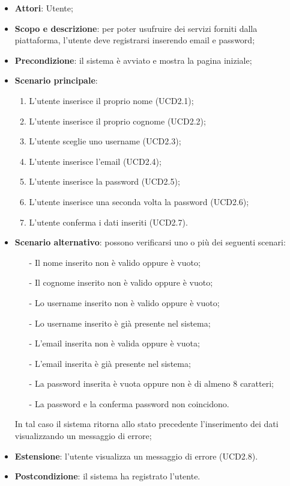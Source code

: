 \begin{itemize}
\item \textbf{Attori}: Utente;
\item \textbf{Scopo e descrizione}: per poter usufruire dei servizi forniti dalla piattaforma, l'utente deve registrarsi inserendo email e password;
\item \textbf{Precondizione}: il sistema è avviato e mostra la pagina iniziale;
\item \textbf{Scenario principale}:
	\begin{enumerate}
	\item L'utente inserisce il proprio nome (UCD2.1);
	\item L'utente inserisce il proprio cognome (UCD2.2);
	\item L'utente sceglie uno username (UCD2.3);
	\item L'utente inserisce l'email (UCD2.4);
	\item L'utente inserisce la password (UCD2.5);
	\item L'utente inserisce una seconda volta la password (UCD2.6);
	\item L'utente conferma i dati inseriti (UCD2.7).
	\end{enumerate}
\item \textbf{Scenario alternativo}: possono verificarsi uno o più dei seguenti scenari:
	\begin{itemize}
	\item[-] Il nome inserito non è valido oppure è vuoto;
	\item[-] Il cognome inserito non è valido oppure è vuoto;
	\item[-] Lo username inserito non è valido oppure è vuoto;
	\item[-] Lo username inserito è già presente nel sistema;
	\item[-] L'email inserita non è valida oppure è vuota;
	\item[-] L'email inserita è già presente nel sistema;
	\item[-] La password inserita è vuota oppure non è di almeno 8 caratteri;
	\item[-] La password e la conferma password non coincidono.
	\end{itemize}
In tal caso il sistema ritorna allo stato precedente l'inserimento dei dati visualizzando un messaggio di errore;
\item \textbf{Estensione}: l'utente visualizza un messaggio di errore (UCD2.8).
\item \textbf{Postcondizione}: il sistema ha registrato l'utente.
\end{itemize}

